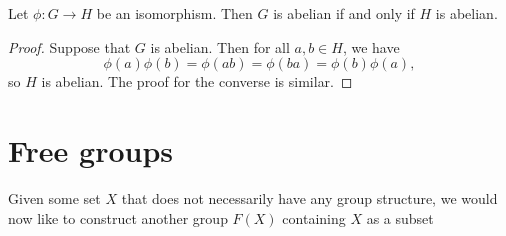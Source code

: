 \begin{theorem}
    Let \(\phi : G \to H\) be an isomorphism. Then \(G\) is abelian if and only
    if \(H\) is abelian.
\end{theorem}

\begin{proof}
    Suppose that \(G\) is abelian. Then for all \(a, b \in H\), we have
    \[
        \phi(a)\phi(b) = \phi(ab) = \phi(ba) = \phi(b)\phi(a),
    \]
    so \(H\) is abelian. The proof for the converse is similar.
\end{proof}

\section{Free groups}

\begin{sectionthm}
    Given some set \(X\) that does not necessarily have any group structure, we
    would now like to construct another group \(F(X)\) containing \(X\) as a
    subset
\end{sectionthm}

